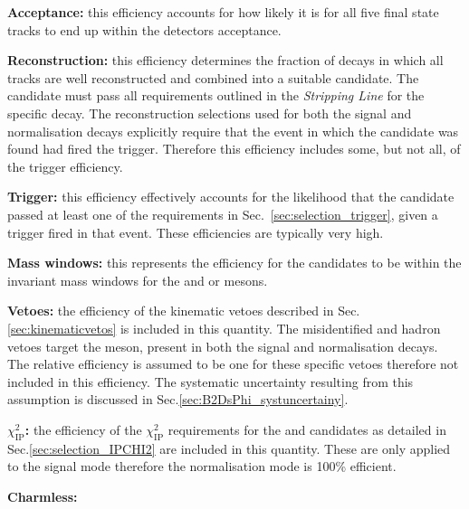 

\begin{description}

\item \textbf{Acceptance:} this efficiency accounts for how likely it is for all five final state tracks to end up within the \lhcb detectors acceptance. 

\item \textbf{Reconstruction:} this efficiency determines the fraction of decays in which all tracks are well reconstructed and combined into a suitable candidate. The candidate must pass all requirements outlined in the \emph{Stripping Line} for the specific decay. The reconstruction selections used for both the signal and normalisation decays explicitly require that the event in which the candidate was found had fired the trigger. Therefore this efficiency includes some, but not all, of the trigger efficiency.

\item \textbf{Trigger:} this efficiency effectively accounts for the likelihood that the candidate passed at least one of the requirements in Sec.~\ref{sec:selection_trigger}, given a trigger fired in that event. These efficiencies are typically very high. 

\item \textbf{Mass windows:} this represents the efficiency for the candidates to be within the invariant mass windows for the \Dsp and \phiz or \Dzb mesons.

\item \textbf{Vetoes:} the efficiency of the kinematic vetoes described in Sec.\ref{sec:kinematicvetos} is included in this quantity. The misidentified \D and \Lc hadron vetoes target the \Dsp meson, present in both the signal and normalisation decays. The relative efficiency is assumed to be one for these specific vetoes therefore not included in this efficiency. The systematic uncertainty resulting from this assumption is discussed in Sec.\ref{sec:B2DsPhi_systuncertainy}.

\item \textbf{$\chi^{2}_{\text{IP}}$:} the efficiency of the $\chi^{2}_{\text{IP}}$ requirements for the \Bp and \Dsp candidates as detailed in Sec.\ref{sec:selection_IPCHI2} are included in this quantity. These are only applied to the signal mode therefore the normalisation mode is 100\% efficient.

\item \textbf{Charmless:} 

\end{description}





